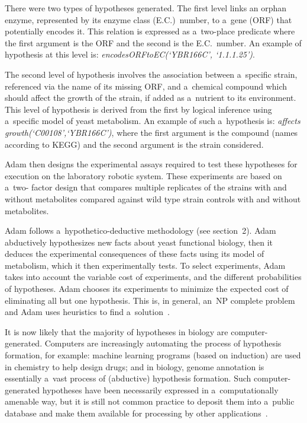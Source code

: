\begin{multicols}{2}
  There were two types of hypotheses generated. The first level links an orphan
enzyme, represented by its enzyme class (E.C.)\ number, to a~gene (ORF) that
potentially encodes it. This relation is expressed as a~two-place predicate where the
first argument is the ORF and the second is the E.C.\ number. An example of
hypothesis at this level is: \textit{encodesORFtoEC(`YBR166C', `1.1.1.25')}.

  The second level of hypothesis involves the association between a~specific strain,
referenced via the name of its missing ORF, and a~chemical compound which should
affect the growth of the strain, if added as a~nutrient to its environment. This level of
hypothesis is derived from the first by logical inference using a~specific model of
yeast metabolism. An example of such a~hypothesis is: \textit{affects
growth(`C00108',`YBR166C')}, where the first argument is the compound (names
according to KEGG) and the second argument is the  strain considered.

  Adam then designs the experimental assays required to test these hypotheses for
execution on the laboratory robotic system. These experiments are based on a~two-
factor design that compares multiple replicates of the strains with and without
metabolites compared against wild type strain controls with and without metabolites.



  Adam follows a~hypothetico-deductive methodology (see section~2). Adam
abductively hypothesizes new facts about yeast functional biology, then it deduces
the experimental consequences of these facts using its model of metabolism, which it
then experimentally tests. To select experiments, Adam takes into account the variable
cost of experiments, and the different probabilities of hypotheses. Adam chooses its
experiments to minimize the expected cost of eliminating all but one hypothesis.
This
is, in general, an~NP complete problem and Adam uses heuristics to find a~solution~\cite{45-kl}.

  It is now likely that the majority of hypotheses in biology are computer-generated.
Computers are increasingly automating the process of hypothesis formation, for
example: machine learning programs (based on induction) are used in chemistry to
help design drugs; and in biology, genome annotation is essentially a~vast process of
(abductive) hypothesis formation. Such computer-generated hypotheses have been
necessarily expressed in a~computationally amenable way, but it is still not common
practice to deposit them into a~public database and make them available for
processing by other applications~\cite{45-kl}.


\end{multicols}
